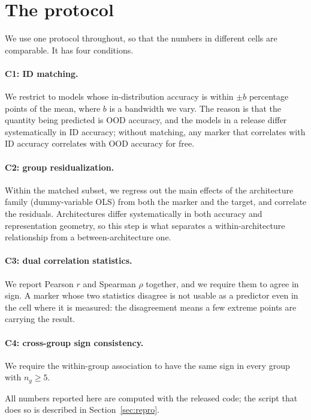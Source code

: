 \documentclass[10pt]{article}
\begin{document}
\section{The protocol}

\label{sec:protocol}

We use one protocol throughout, so that the numbers in different cells are
comparable. It has four conditions.

\paragraph{C1: ID matching.}
We restrict to models whose in-distribution accuracy is within $\pm b$
percentage points of the mean, where $b$ is a bandwidth we vary. The reason is
that the quantity being predicted is OOD accuracy, and the models in a release
differ systematically in ID accuracy; without matching, any marker that
correlates with ID accuracy correlates with OOD accuracy for free.

\paragraph{C2: group residualization.}
Within the matched subset, we regress out the main effects of the architecture
family (dummy-variable OLS) from both the marker and the target, and correlate
the residuals. Architectures differ systematically in both accuracy and
representation geometry, so this step is what separates a within-architecture
relationship from a between-architecture one.

\paragraph{C3: dual correlation statistics.}
We report Pearson $r$ and Spearman $\rho$ together, and we require them to
agree in sign. A marker whose two statistics disagree is not usable as a
predictor even in the cell where it is measured: the disagreement means a few
extreme points are carrying the result.

\paragraph{C4: cross-group sign consistency.}
We require the within-group association to have the same sign in every group
with $n_g \ge 5$.

All numbers reported here are computed with the released code; the script that
does so is described in Section~\ref{sec:repro}.
\end{document}
